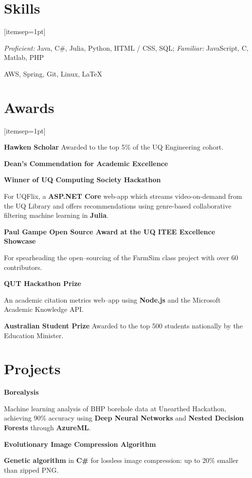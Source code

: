 \documentclass[a4paper]{article}
\renewenvironment{itemize}{
  \begin{list}{}{
    \setlength{\leftmargin}{1.5em}
  }
}{
  \end{list}
}
\newcommand{\dateitem}[1] {\item[\textbf{#1 :}]}
\newcommand{\resumesection}[1]{\section*{\accentcolour #1}}
\newcommand{\accentcolour}{\color{NavyBlue}}
\begin{document}
\resumesection{Skills}
\begin{itemize}[itemsep=1pt]
	\dateitem{Languages} {
%		

	\textit{Proficient:} Java, C\#, Julia, Python, HTML / CSS, SQL;
	\textit{Familiar:} JavaScript, C, Matlab, PHP
	}
	\dateitem{Technologies} {
		AWS, Spring, Git, Linux, \LaTeX
	}
\end{itemize}

\resumesection{Awards}
\begin{itemize}[itemsep=1pt]
	\dateitem{2017 -- 2019} {\textbf{Hawken Scholar} Awarded to the top 5\% of the UQ Engineering cohort.
	}
	\dateitem{2016 -- 2018} \textbf{Dean's Commendation for Academic Excellence}
	\dateitem{2016} {\textbf{Winner of UQ Computing Society Hackathon}
		
		For UQFlix, a \textbf{ASP.NET Core} web-app which streams video-on-demand from the UQ Library and offers recommendations using genre-based collaborative filtering machine learning in \textbf{Julia}.
	}
	\dateitem{2015} {\textbf{Paul Gampe Open Source Award at the UQ ITEE Excellence Showcase}
		
		For spearheading the open--sourcing of the FarmSim class project with over 60 contributors.
	}

	\dateitem{2015} {\textbf{QUT Hackathon Prize}
		
		
		An academic citation metrics web--app using \textbf{Node.js} and the Microsoft Academic Knowledge API.
		
	}
	\dateitem{2013} {\textbf{Australian Student Prize} Awarded to the top 500 students nationally by the Education Minister.
	}
\end{itemize}

\resumesection{Projects}
\begin{itemize}	
	\dateitem{2016} {\textbf{Borealysis}
		
		Machine learning analysis of BHP borehole data at Unearthed Hackathon, achieving 90\% accuracy using \textbf{Deep Neural Networks} and \textbf{Nested Decision Forests} through \textbf{AzureML}.
	}
	
	\dateitem{2013} {\textbf{Evolutionary Image Compression Algorithm}
		
		\textbf{Genetic algorithm} in \textbf{C\#} for lossless image compression: up to 20\% smaller than zipped PNG.
	}
\end{itemize}

\bigskip
\end{document}
